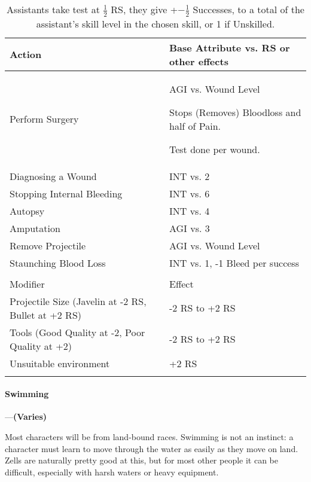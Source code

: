 \documentclass[oneside,11pt,english]{book}
\begin{document}
\begin{longtabu} to 1\textwidth {X[1.5]X[r]}
	\caption{Surgery}
	\label{tab:Surgery}\\
	\rowfont[c]{}Action &Base Attribute vs. RS or other effects\\\toprule
Perform Surgery&	AGI vs. Wound Level

					Stops (Removes) Bloodloss and half of Pain.

					Test done per wound.\\
Diagnosing a Wound&INT vs. 2 \\
Stopping Internal Bleeding&INT vs. 6\\
Autopsy&INT vs. 4 \\
Amputation&AGI vs. 3 \\
Remove Projectile&AGI vs. Wound Level \\
Staunching Blood Loss&INT vs. 1, -1 Bleed per success \\
	\\
		\rowfont[c]{}Modifier&Effect\\\cmidrule(lr){1-2}
Projectile Size (Javelin at -2 RS, Bullet at +2 RS)&-2 RS to +2 RS\\
Tools (Good Quality at -2, Poor Quality at +2) &-2 RS to +2 RS\\
Unsuitable environment &+2 RS\\
\caption*{Assistants take test at $ \frac{1}{2} $ RS, they give +$ -\frac{1}{2} $ Successes, to a total of the assistant’s skill level in the chosen skill, or 1 if Unskilled.}
\end{longtabu}

\paragraph{\label{skill:Swimming}Swimming}---\quad\textbf{(Varies)}\par
Most characters will be from land-bound races. Swimming is not an instinct: a character must learn to move through the water as easily as they move on land. Zells are naturally pretty good at this, but for most other people it can be difficult, especially with harsh waters or heavy equipment.
\end{document}
